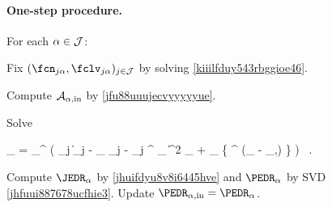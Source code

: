 \paragraph{One-step procedure.}
For each \( \alpha \in \mathcal{J} \):
%
\begin{mylist}
	\item
	Fix \( (\fcn_{\jjl},\fclv_{\jjl})_{j \in \JJJ} \) by solving \eqref{kiiilfduy543rbggioe46}.
%
	\item
	Compute \( \mathcal{A}_{\alpha,\operatorname{in}} \) by \eqref{jfu88uuujecvyyyyyue}.
%
	\item
	Solve
\begin{EQA}[c]
	\BEDR_{\jl}
	=
	\arginf_{\BEDR \in \R^{\dimm \times \dimd}} \biggl( \sum_{j \in \JJJ}
		\bigl\| \Imav_{j} - \fcn_{\jjl} \Sv_{j} - \UV_{j} \BEDR^{\T} \fclv_{\jjl} \bigr\|^{2} \weightM_{\jjl}
		+ \lambda_{\subM} \tr \bigl\{ \BEDR^{\T} \BEDR (\Id_{\dimd} - \IEDR_{\jl,\init}) \bigr\} 
	\biggr)
	\, .
	\qquad
\end{EQA}
%
	\item
	Compute \( \JEDR_{\jl} \) by \eqref{jhuifdyu8v8i6445hve} and \( \PEDR_{\jl} \) by SVD \eqref{jhfuui887678ucfhie3}.
	Update \( \PEDR_{\jl,\init} = \PEDR_{\jl} \).

\end{mylist}

